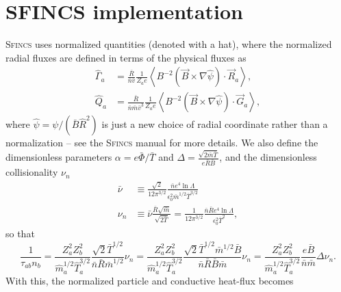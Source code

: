 \documentclass[12pt, a4paper]{article}
\newcommand{\lang}{\left\langle}
\newcommand{\rang}{\right\rangle}
\begin{document}
\section{SFINCS implementation}
\textsc{Sfincs} uses normalized quantities (denoted with a hat), where the normalized radial fluxes are defined in terms of the physical fluxes as
\begin{align}
  \hat{\Gamma}_a &= \frac{\bar{R}}{\bar{n}\bar{v}} \frac{1}{Z_a e} \lang B^{-2} \left(\vec{B} \times \nabla \hat{\psi}\right) \cdot \vec{R}_a \rang, \\
  \hat{Q}_a &= \frac{\bar{R}}{\bar{n}\bar{m}\bar{v}^3} \frac{1}{Z_a e} \lang B^{-2} \left(\vec{B} \times \nabla \hat{\psi}\right) \cdot \vec{G}_a \rang,
\end{align}
where $\hat{\psi} = \psi/(\bar{B}\hat{R}^2)$ is just a new choice of radial coordinate rather than a normalization -- see the \textsc{Sfincs} manual for more details. We also define the dimensionless parameters $\alpha = e\bar{\Phi}/\bar{T}$ and $\Delta = \frac{\sqrt{2\bar{m}\bar{T}}}{e\bar{R}\bar{B}}$, and the dimensionless collisionality $\nu_n$
\begin{align}
  \bar{\nu} &\equiv \frac{\sqrt{2}}{12 \pi^{3/2}} \frac{\bar{n} e^4 \ln \Lambda}{\epsilon_0^2 \bar{m}^{1/2} \bar{T}^{3/2}} \\
  \nu_n &\equiv \bar{\nu} \frac{\bar{R} \sqrt{\bar{m}}}{\sqrt{2\bar{T}}} =\frac{1}{12 \pi^{3/2}} \frac{\bar{n} \bar{R} e^4 \ln \Lambda}{\epsilon_0^2 \bar{T}^{2}},
\end{align}
so that
\begin{equation}
\frac{1}{\tau_{ab} n_b} = \frac{Z_a^2 Z_b^2}{\hat{m}_a^{1/2} \hat{T}_a^{3/2}} \frac{\sqrt{2} \bar{T}^{1/2}}{\bar{n} \bar{R} \bar{m}^{1/2}} \nu_n = \frac{Z_a^2 Z_b^2}{\hat{m}_a^{1/2} \hat{T}_a^{3/2}} \frac{\sqrt{2} \bar{T}^{1/2}\bar{m}^{1/2} \bar{B}}{\bar{n} \bar{R} \bar{B} \bar{m}} \nu_n = \frac{Z_a^2 Z_b^2}{\hat{m}_a^{1/2} \hat{T}_a^{3/2}} \frac{e\bar{B}}{\bar{n}\bar{m}} \Delta \nu_n.
\end{equation}
With this, the normalized particle and conductive heat-flux becomes
\end{document}
